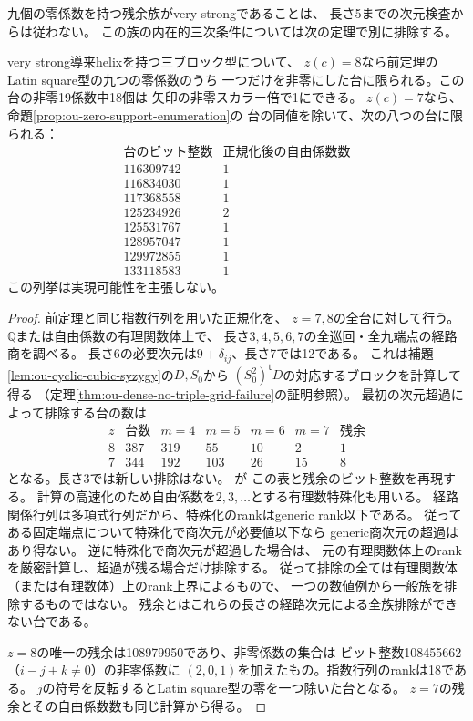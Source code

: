 \begin{remark}
九個の零係数を持つ残余族がvery strongであることは、
長さ5までの次元検査からは従わない。
この族の内在的三次条件については次の定理で別に排除する。
\end{remark}

\begin{theorem}[七・八零係数の台の経路次元による制約]
\label{thm:ou-seven-eight-zero-path-exclusion}
very strong導来helixを持つ三ブロック型について、
$z(c)=8$なら前定理のLatin square型の九つの零係数のうち
一つだけを非零にした台に限られる。この台の非零19係数中18個は
矢印の非零スカラー倍で1にできる。
$z(c)=7$なら、命題\ref{prop:ou-zero-support-enumeration}の
台の同値を除いて、次の八つの台に限られる：
\[
\begin{array}{r|c}
\text{台のビット整数}&\text{正規化後の自由係数数}\\ \hline
116309742&1\\
116834030&1\\
117368558&1\\
125234926&2\\
125531767&1\\
128957047&1\\
129972855&1\\
133118583&1
\end{array}
\]
この列挙は実現可能性を主張しない。
\end{theorem}
\begin{proof}
前定理と同じ指数行列を用いた正規化を、
$z=7,8$の全台に対して行う。
$\mathbb Q$または自由係数の有理関数体上で、
長さ$3,4,5,6,7$の全巡回・全九端点の経路商を調べる。
長さ6の必要次元は$9+\delta_{ij}$、長さ7では12である。
これは補題\ref{lem:ou-cyclic-cubic-syzygy}の$D,S_0$から
$(S_0^2)^{\mathsf t}D$の対応するブロックを計算して得る
（定理\ref{thm:ou-dense-no-triple-grid-failure}の証明参照）。
最初の次元超過によって排除する台の数は
\[
\begin{array}{r|r|r|r|r|r|r}
z&\text{台数}&m=4&m=5&m=6&m=7&\text{残余}\\ \hline
8&387&319&55&10&2&1\\
7&344&192&103&26&15&8
\end{array}
\]
となる。長さ3では新しい排除はない。
が
この表と残余のビット整数を再現する。
計算の高速化のため自由係数を$2,3,\ldots$とする有理数特殊化も用いる。
経路関係行列は多項式行列だから、特殊化のrankはgeneric rank以下である。
従ってある固定端点について特殊化で商次元が必要値以下なら
generic商次元の超過はあり得ない。
逆に特殊化で商次元が超過した場合は、
元の有理関数体上のrankを厳密計算し、超過が残る場合だけ排除する。
従って排除の全ては有理関数体（または有理数体）上のrank上界によるもので、
一つの数値例から一般族を排除するものではない。
残余とはこれらの長さの経路次元による全族排除ができない台である。

$z=8$の唯一の残余は108979950であり、非零係数の集合は
ビット整数108455662（$i-j+k\ne0$）の非零係数に
$(2,0,1)$を加えたもの。指数行列のrankは18である。
$j$の符号を反転するとLatin square型の零を一つ除いた台となる。
$z=7$の残余とその自由係数数も同じ計算から得る。
\end{proof}

